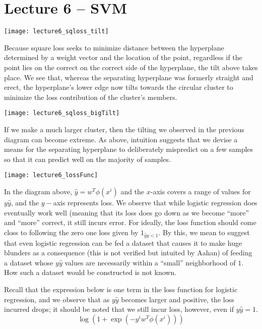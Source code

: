 \documentclass[../main.tex]{subfiles}
\begin{document}
\section{Lecture 6 -- SVM}


\begin{remark}
    \begin{center}
        \texttt{[image: lecture6\_sqloss\_tilt]}
    \end{center}

    Because square loss seeks to minimize
    distance between the hyperplane determined by a weight vector
    and the location of the point, regardless if the point lies on the correct on the correct side of the hyperplane, the tilt above takes place. We see that, whereas the separating hyperplane was formerly straight and erect, the hyperplane's lower edge now tilts towards the circular cluster to minimize the loss contribution of the cluster's members.
\end{remark}

\begin{remark}
    \begin{center}
        \texttt{[image: lecture6\_sqloss\_bigTilt]}
    \end{center}

    If we make a much larger cluster, then the tilting we observed in the previous diagram
    can become extreme. As above, intuition suggests that we devise a means for the separating
    hyperplane to deliberately mispredict on a few samples so that it can predict well
    on the majority of samples.

    \begin{center}
        \texttt{[image: lecture6\_lossFunc]}
    \end{center}

    In the diagram above, $\hat{y} = w^T\phi(x^{i})$ and the $x$-axis covers a range of
    values for $y\hat{y}$, and the $y-$axis represents loss. We observe that while
    logistic regression does eventually work well (meaning that its loss does go down
    as we become ``more'' and ``more'' correct, it still incurs error. For ideally,
    the loss function should come closs to following the zero one loss given by
    $1_{\hat{y}y < 1}.$ By this, we mean to suggest that even logistic regression can
    be fed a dataset that causes it to make huge blunders as a consequence (this is not
    verified but intuited by Aahan) of feeding a dataset whose $y\hat{y}$ values are necessarily within a ``small'' neighborhood of $1$. How such a dataset would be constructed is not
    known.

    Recall that the expression below is one term in the loss function for logistic
    regression, and we observe that as $y\hat{y}$ becomes larger and positive, the loss
    incurred drops; it should be noted that we still incur loss, however, even if $y\hat{y} = 1$.
    \[
        \log(1 + \exp{(-y^{i} w^T\phi(x^{i}))})
    \]
\end{remark}
\end{document}
